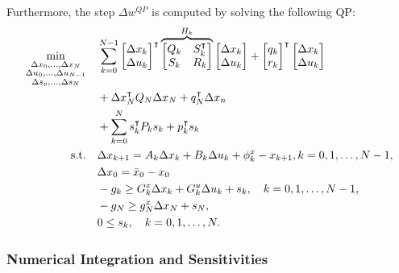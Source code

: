 \documentclass{thesisreport}
\begin{document}
Furthermore, the step $\Delta w^{QP}$ is computed by solving the following QP: 
    \begin{equation}\label{step_QP}
        \begin{aligned}
        \min_{\substack{\Delta x_0,\ldots,\Delta x_N\\ \Delta u_0,\ldots, \Delta u_{N-1} \\ \Delta s_o,\ldots, \Delta s_N }} \quad & \sum_{k=0}^{N-1}{  \begin{bmatrix} \Delta x_k \\ \Delta u_k \end{bmatrix}^{\intercal} \overbrace{\begin{bmatrix} Q_k & S_k^{\intercal} \\ S_k & R_k \end{bmatrix}}^{H_k} \begin{bmatrix} \Delta x_k \\ \Delta u_k \end{bmatrix} + \begin{bmatrix} q_k \\ r_k \end{bmatrix}^{\intercal} \begin{bmatrix} \Delta x_k \\ \Delta u_k \end{bmatrix}} \\ & + \Delta x_N^{\intercal} Q_N \Delta x_N + q_N^{\intercal} \Delta x_n \\ & + \sum_{k=0}^N s_k^{\intercal} P_k s_k + p_k^{\intercal} s_k \\
        \textrm{s.t.} \quad & \Delta x_{k+1} = A_k \Delta x_k + B_k \Delta u_k + \phi_k^x - x_{k+1},  k=0,1, \ldots, N-1,\\
            & \Delta x_0 = \bar{x}_0 - x_0 \\
            & -g_k \geq G_k^x \Delta x_k + G_k^u \Delta u_k + s_k, \text{\space \space \space} k=0,1, \ldots, N-1, \\
            & -g_N \geq g_N^x \Delta x_N + s_N, \\
            & 0 \leq s_k, \text{\space \space \space} k=0,1, \ldots, N.
        \end{aligned}
    \end{equation}

\newpage

\subsubsection{Numerical Integration and Sensitivities}
\end{document}
